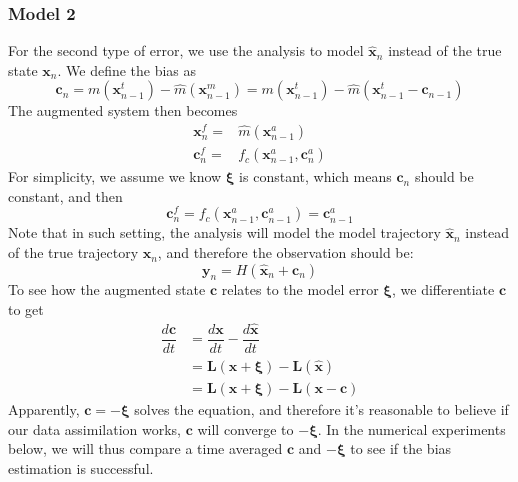 \documentclass[twocolumn]{article}
\begin{document}
\subsubsection{Model 2} \label{model2}
For the second type of error, we use the analysis to model $\hat{\pmb{x}}_n$ instead of the true state $\pmb{x}_n$. We define the bias as
\begin{equation}
\pmb{c}_{n}=m(\pmb{x}_{n-1}^{t})-\hat{m}(\pmb{x}_{n-1}^{m})=m(\pmb{x}_{n-1}^{t})-\hat{m}(\pmb{x}_{n-1}^{t}-\pmb{c}_{n-1})
\end{equation}
The augmented system then becomes
\begin{align}
\pmb{x}_{n}^{f}=&\hat{m}(\pmb{x}_{n-1}^{a})\\
\pmb{c}_{n}^{f}=&f_{c}(\pmb{x}_{n-1}^{a},\pmb{c}_{n}^{a})
\end{align}
For simplicity, we assume we know $\pmb{\xi}$ is constant, which means $\pmb{c}_n$ should be constant, and then
\begin{equation}
\pmb{c}_{n}^{f}=f_{c}(\pmb{x}_{n-1}^{a},\pmb{c}_{n-1}^{a})=\pmb{c}_{n-1}^{a}
\end{equation} 
Note that in such setting, the analysis will model the model trajectory $\hat{\pmb{x}}_{n}$ instead of the true trajectory $\pmb{x}_n$, and therefore the observation should be:
\begin{equation}
\pmb{y}_n=H(\hat{\pmb{x}}_n+\pmb{c}_n)
\end{equation}
To see how the augmented state $\pmb{c}$ relates to the model error $\pmb{\xi}$, we differentiate $\pmb{c}$ to get
\begin{equation} \label{c&xi}
\begin{split}
\dfrac{d\pmb{c}}{dt}&=\dfrac{d\pmb{x}}{dt}-\dfrac{d\hat{\pmb{x}}}{dt}\\
&=\pmb{L}(\pmb{x}+\pmb{\xi})-\pmb{L}(\hat{\pmb{x}})\\
&=\pmb{L}(\pmb{x}+\pmb{\xi})-\pmb{L}(\pmb{x}-\pmb{c})
\end{split}
\end{equation}
Apparently, $\pmb{c}=-\pmb{\xi}$ solves the equation, and therefore it's reasonable to believe if our data assimilation works, $\pmb{c}$ will converge to $-\pmb{\xi}$. In the numerical experiments below, we will thus compare a time averaged $\pmb{c}$ and $-\pmb{\xi}$ to see if the bias estimation is successful.
\end{document}
